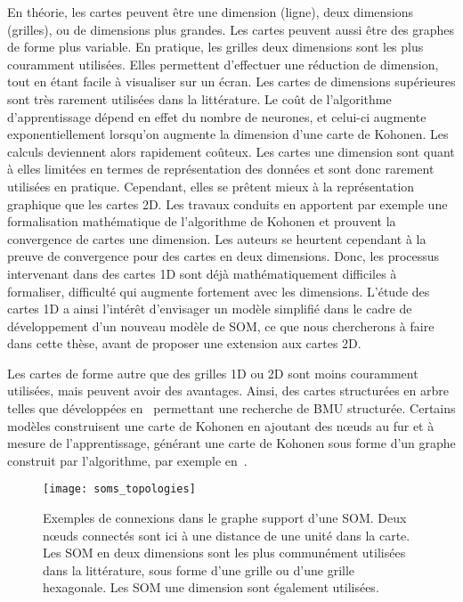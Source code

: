 \documentclass[../main]{subfiles}
\begin{document}
En théorie, les cartes peuvent être une dimension (ligne), deux dimensions (grilles), ou de dimensions plus grandes. Les cartes peuvent aussi être des graphes de forme plus variable. En pratique, les grilles deux dimensions sont les plus couramment utilisées. Elles permettent d'effectuer une réduction de dimension, tout en étant facile à visualiser sur un écran. Les cartes de dimensions supérieures sont très rarement utilisées dans la littérature. Le coût de l'algorithme d'apprentissage dépend en effet du nombre de neurones, et celui-ci augmente exponentiellement lorsqu'on augmente la dimension d'une carte de Kohonen. Les calculs deviennent alors rapidement coûteux.
Les cartes une dimension sont quant à elles limitées en termes de représentation des données et sont donc rarement utilisées en pratique. Cependant, elles se prêtent mieux à la représentation graphique que les cartes 2D.
Les travaux conduits en \cite{cottrell_theoretical_2016,fort_soms_2006} apportent par exemple une formalisation mathématique de l'algorithme de Kohonen et prouvent la convergence de cartes une dimension. Les auteurs se heurtent cependant à la preuve de convergence pour des cartes en deux dimensions. Donc, les processus intervenant dans des cartes 1D sont déjà mathématiquement difficiles à formaliser, difficulté qui augmente fortement avec les dimensions.
L'étude des cartes 1D a ainsi l'intérêt d'envisager un modèle simplifié dans le cadre de développement d'un nouveau modèle de SOM, ce que nous chercherons à faire dans cette thèse, avant de proposer une extension aux cartes 2D.

Les cartes de forme autre que des grilles 1D ou 2D sont moins couramment utilisées, mais peuvent avoir des avantages. Ainsi, des cartes structurées en arbre telles que développées en~\cite{koikkalainen_self-organizing_1990} permettant une recherche de BMU structurée. Certains modèles construisent une carte de Kohonen en ajoutant des n\oe{}uds au fur et à mesure de l'apprentissage, générant une carte de Kohonen sous forme d'un graphe construit par l'algorithme, par exemple en~\cite{alahakoon_dynamic_2000, yamaguchi_adaptive_2010}.

\begin{figure}
\centering
\texttt{[image: soms\_topologies]}
\caption{Exemples de connexions dans le graphe support d'une SOM. Deux n\oe{}uds connectés sont ici à une distance de une unité dans la carte.
Les SOM en deux dimensions sont les plus communément utilisées dans la littérature, sous forme d'une grille ou d'une grille hexagonale. Les SOM une dimension sont également utilisées. \label{fig:topo}}

\end{figure}
\end{document}
